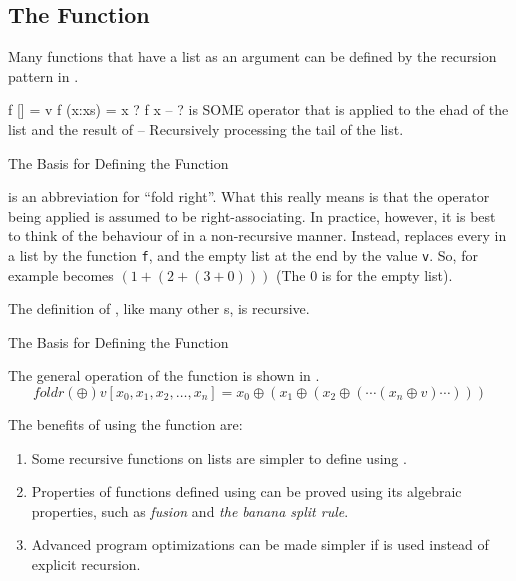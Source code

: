 \subsection{The \texorpdfstring{}{\texttt{foldr}} Function}\label{subsec:Foldr_Function}
Many functions that have a list as an argument can be defined by the recursion pattern in .

\begin{listing}[h!tbp]
\begin{haskellsource}
f [] = v
f (x:xs) = x ? f x
-- ? is SOME operator that is applied to the ehad of the list and the result of
-- Recursively processing the tail of the list.
\end{haskellsource}
\caption{The Basis for Defining the  Function}
\label{lst:Foldr_Basis}
\end{listing}

 is an abbreviation for ``fold right''.
What this really means is that the operator being applied is assumed to be right-associating.
In practice, however, it is best to think of the behaviour of  in a non-recursive manner.
Instead,  replaces every  in a list by the function \texttt{f}, and the empty list at the end by the value \texttt{v}.
So, for example  becomes $(1+(2+(3+0)))$ (The 0 is for the empty list).

The definition of , like many other s, is recursive.

\begin{listing}[h!tbp]
\caption{The Basis for Defining the  Function}
\label{lst:Foldr_Basis}
\end{listing}

The general operation of the  function is shown in .
\begin{equation}\label{eq:General_foldr_Operation}
  foldr (\oplus) v [x_{0}, x_{1}, x_{2}, \ldots, x_{n}] = x_{0} \oplus (x_{1} \oplus (x_{2} \oplus (\cdots (x_{n} \oplus v) \cdots )))
\end{equation}

The benefits of using the  function are:
\begin{enumerate}[noitemsep]
\item Some recursive functions on lists are simpler to define using .
\item Properties of functions defined using  can be proved using its algebraic properties, such as \emph{fusion} and \emph{the banana split rule}.
\item Advanced program optimizations can be made simpler if  is used instead of explicit recursion.
\end{enumerate}

